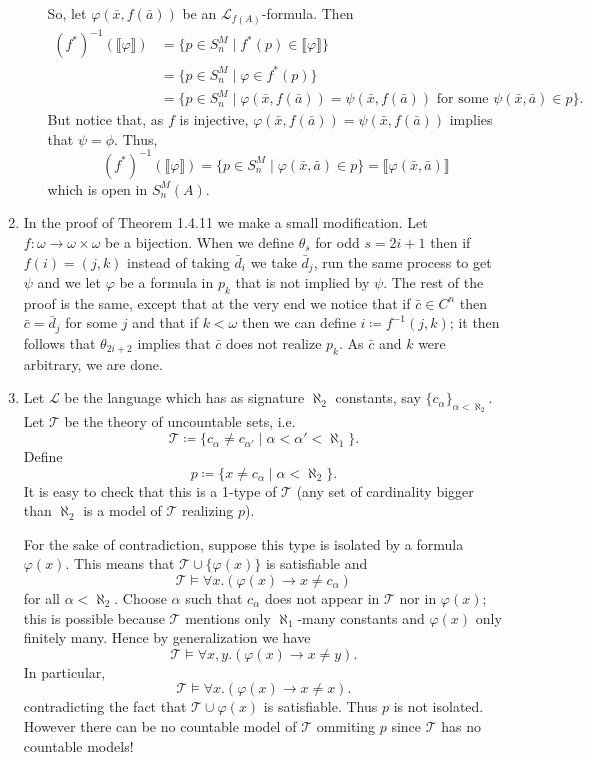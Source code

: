 \documentclass{article}
\theoremstyle{theorem}
\begin{document}
\begin{enumerate}[leftmargin=*]
\begin{enumerate}
			So, let $\varphi(\bar{x},f(\bar{a}))$ be an $\mathcal{L}_{f(A)}$-formula. Then
			\begin{align*}
				(f^*)^{-1}(\llbracket \varphi\rrbracket) &= \{p\in S_n^M \mid f^*(p)\in \llbracket \varphi\rrbracket\}\\
				&= \{p\in S_n^M \mid \varphi\in f^*(p)\}\\
				&= \{p\in S_n^M \mid \varphi(\bar{x},f(\bar{a}))= \psi(\bar{x}, f(\bar{a})) \text{ for some }\psi(\bar{x},\bar{a})\in p\}.
			\end{align*}
			But notice that, as $f$ is injective, $\varphi(\bar{x},f(\bar{a}))= \psi(\bar{x}, f(\bar{a}))$ implies that $\psi = \phi$. Thus,
			\[
				(f^*)^{-1}(\llbracket \varphi\rrbracket) = \{p\in S_n^M \mid \varphi(\bar{x},\bar{a})\in p\} = \llbracket \varphi(\bar{x},\bar{a})\rrbracket
			\] 
			which is open in $S_n^M(A)$.
		\end{enumerate}
		\item In the proof of Theorem 1.4.11 we make a small modification. Let $f\colon \omega \to \omega \times \omega$ be a bijection. When we define $\theta_s$ for odd $s= 2i + 1$ then if $f(i) = (j,k)$ instead of taking $\bar{d}_i$ we take $\bar{d}_j$, run the same process to get $\psi$ and we let $\varphi$ be a formula in $p_k$ that is not implied by $\psi$. The rest of the proof is the same, except that at the very end we notice that if $\bar{c}\in C^n$ then $\bar{c}= \bar{d}_j$ for some $j$ and that if $k< \omega$ then we can define $i\coloneqq f^{-1}(j,k)$; it then follows that $\theta_{2i+2}$ implies that $\bar{c}$ does not realize $p_k$. As $\bar{c}$ and $k$ were arbitrary, we are done.
		
		\item Let $\mathcal{L}$ be the language which has as signature $\aleph_2$ constants, say $\{c_\alpha\}_{\alpha < \aleph_2}$. Let $\mathcal{T}$ be the theory of uncountable sets, i.e.
		\[
			\mathcal{T} \coloneqq \{c_\alpha \neq c_{\alpha'} \mid \alpha<\alpha' <\aleph_1\}.
		\]
		Define
		\[
			p \coloneqq \{x \neq c_{\alpha} \mid \alpha < \aleph_2\}.
		\]
		It is easy to check that this is a 1-type of $\mathcal{T}$ (any set of cardinality bigger than $\aleph_2$ is a model of $\mathcal{T}$ realizing $p$). 
		
		For the sake of contradiction, suppose this type is isolated by a formula $\varphi(x)$. This means that $\mathcal{T}\cup \{\varphi(x)\}$ is satisfiable and
		\[
			\mathcal{T} \models \forall x. (\varphi(x) \rightarrow x \neq c_{\alpha})
		\]
		for all $\alpha < \aleph_2$. Choose $\alpha$ such that $c_{\alpha}$ does not appear in $\mathcal{T}$ nor in $\varphi(x)$; this is possible because $\mathcal{T}$ mentions only $\aleph_1$-many constants and $\varphi(x)$ only finitely many. Hence by generalization we have
		\[
		\mathcal{T} \models \forall x,y. (\varphi(x) \rightarrow x \neq y).
		\]
		In particular,
		\[
		\mathcal{T} \models \forall x. (\varphi(x) \rightarrow x \neq x).
		\]
		contradicting the fact that $\mathcal{T} \cup{\varphi(x)}$ is satisfiable. Thus $p$ is not isolated. However there can be no countable model of $\mathcal{T}$ ommiting $p$ since $\mathcal{T}$ has no countable models!
		

\end{enumerate}
\end{document}
